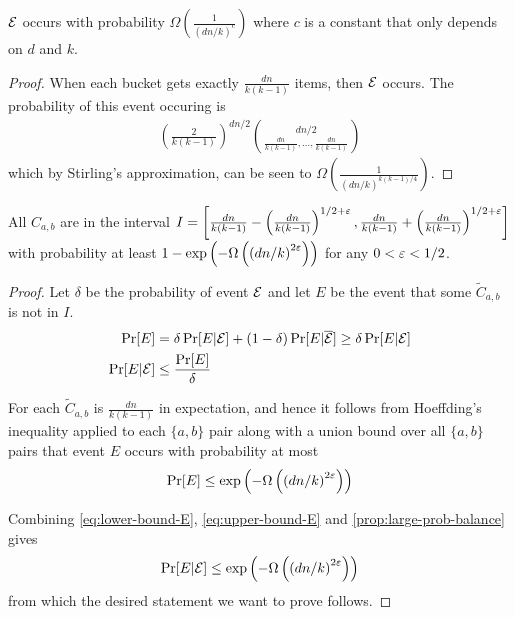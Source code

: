 \begin{proposition}	\label{prop:large-prob-balance}
$\mathcal{E}$ occurs with probability $\Omega\left(\frac{1}{(dn/k)^c}\right)$ where $c$ is a constant that only depends on $d$ and $k$.
\end{proposition}
\begin{proof}
When each bucket gets exactly $\frac{dn}{k(k-1)}$ items, then $\mathcal{E}$ occurs.  The probability of this event occuring is
\begin{align*}
\left(\frac{2}{k(k-1)}\right)^{dn/2}\binom{dn/2}{\frac{dn}{k(k-1)},\dots,\frac{dn}{k(k-1)}}
\end{align*}
which by Stirling's approximation, can be seen to $\Omega\left(\frac{1}{(dn/k)^{k(k-1)/4}}\right)$.
\end{proof}

\begin{proposition}	\label{prop:C-concentration}
All $C_{a,b}$ are in the interval $I = \left[\frac{dn}{k(k-1)}-\left(\frac{dn}{k(k-1)}\right)^{1/2+\varepsilon}, \frac{dn}{k(k-1)}+\left(\frac{dn}{k(k-1)}\right)^{1/2+\varepsilon}\right]$ with probability at least $1-\exp\left(-\Omega\left(\left(dn/k\right)^{2\varepsilon}\right)\right)$ for any $0 < \varepsilon < 1/2$.
\end{proposition}
\begin{proof}
	Let $\delta$ be the probability of event $\mathcal{E}$ and let $E$ be the event that some $\widetilde{C}_{a,b}$ is not in $I$.
	\begin{align}
		\begin{split}
		\Pr[E] &= \delta\Pr[E|\mathcal{E}] + (1-\delta)\Pr[E|\overline{\mathcal{E}}] \ge \delta\Pr[E|\mathcal{E}]\\
		\Pr[E|\mathcal{E}] &\le \frac{\Pr[E]}{\delta}	\label{eq:lower-bound-E}
		\end{split}
	\end{align}

	For each $\widetilde{C}_{a,b}$ is $\frac{dn}{k(k-1)}$ in expectation, and hence it follows from Hoeffding's inequality applied to each $\{a,b\}$ pair along with a union bound over all $\{a,b\}$ pairs that event $E$ occurs with probability at most
	\begin{align}
		\Pr[E] \le \exp\left(-\Omega\left(\left(dn/k\right)^{2\varepsilon}\right)\right)	\label{eq:upper-bound-E}
	\end{align}

	Combining \eqref{eq:lower-bound-E}, \eqref{eq:upper-bound-E} and \eqref{prop:large-prob-balance} gives
	\[
		\Pr[E|\mathcal{E}] \le \exp\left(-\Omega\left(\left(dn/k\right)^{2\varepsilon}\right)\right)
	\]
	from which the desired statement we want to prove follows.
\end{proof}


